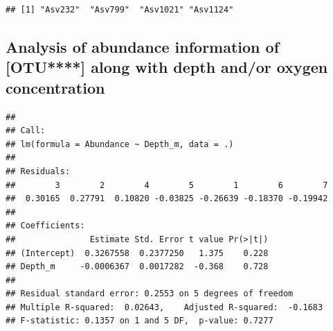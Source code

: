 \documentclass[11 pt,]{article}
\newenvironment{Shaded}{\begin{snugshade}}{\end{snugshade}}
\newcommand{\KeywordTok}[1]{\textcolor[rgb]{0.13,0.29,0.53}{\textbf{#1}}}
\newcommand{\DataTypeTok}[1]{\textcolor[rgb]{0.13,0.29,0.53}{#1}}
\newcommand{\StringTok}[1]{\textcolor[rgb]{0.31,0.60,0.02}{#1}}
\newcommand{\OperatorTok}[1]{\textcolor[rgb]{0.81,0.36,0.00}{\textbf{#1}}}
\newcommand{\NormalTok}[1]{#1}
\begin{document}
\begin{verbatim}
## [1] "Asv232"  "Asv799"  "Asv1021" "Asv1124"
\end{verbatim}

\subsection{\texorpdfstring{Analysis of abundance information of
{[}OTU****{]} along with depth and/or oxygen concentration
\label{sec:OTUabundance}}{Analysis of abundance information of {[}OTU****{]} along with depth and/or oxygen concentration }}\label{analysis-of-abundance-information-of-otu-along-with-depth-andor-oxygen-concentration}

\begin{Shaded}
\end{Shaded}

\begin{verbatim}
## 
## Call:
## lm(formula = Abundance ~ Depth_m, data = .)
## 
## Residuals:
##        3        2        4        5        1        6        7 
##  0.30165  0.27791  0.10820 -0.03825 -0.26639 -0.18370 -0.19942 
## 
## Coefficients:
##               Estimate Std. Error t value Pr(>|t|)
## (Intercept)  0.3267558  0.2377250   1.375    0.228
## Depth_m     -0.0006367  0.0017282  -0.368    0.728
## 
## Residual standard error: 0.2553 on 5 degrees of freedom
## Multiple R-squared:  0.02643,    Adjusted R-squared:  -0.1683 
## F-statistic: 0.1357 on 1 and 5 DF,  p-value: 0.7277
\end{verbatim}
\end{document}
